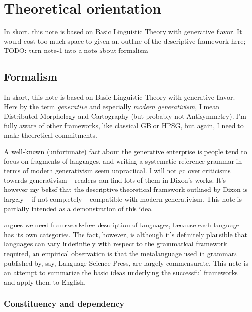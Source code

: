 \documentclass[UTF8, a4paper, oneside, scheme=plain, 12pt]{ctexbook}
\newcommand*{\term}[1]{\emph{#1}}
\begin{document}
\section{Theoretical orientation}

{\small

In short, this note is based on Basic Linguistic Theory 
\citep{dixon2009basic1,dixon2010basic2,dixon2012basic3}
with generative flavor.
It would cost too much space to given an outline of the descriptive framework here; 
TODO: turn note-1 into a note about formalism

\subsection{Formalism}

In short, this note is based on Basic Linguistic Theory 
\citep{dixon2009basic1,dixon2010basic2,dixon2012basic3}
with generative flavor.
Here by the term \term{generative}
and especially \term{modern generativism}, 
I mean Distributed Morphology and Cartography
(but probably not Antisymmetry).
I'm fully aware of other frameworks,
like classical GB or HPSG, 
but again, I need to make theoretical commitments.

A well-known (unfortunate) fact about the generative enterprise is 
people tend to focus on fragments of languages,
and writing a systematic reference grammar in terms of modern generativism
seem unpractical.
I will not go over criticisms towards generativism -- 
readers can find lots of them in Dixon's works.
It's however my belief that the descriptive theoretical framework outlined by Dixon 
is largely -- if not completely -- compatible with modern generativism.
This note is partially intended as a demonstration of this idea.

\citet{frameworkfree} argues we need framework-free description of languages,
because each language has its own categories.
The fact, however, is although it's definitely plausible that 
languages can vary indefinitely with respect to 
the grammatical framework required, 
an empirical observation is 
that the metalanguage used in grammars published by, say, Language Science Press, 
are largely commensurate.
This note is an attempt to summarize the basic ideas underlying 
the successful frameworks and apply them to English.


\subsubsection{Constituency and dependency}

}
\end{document}
